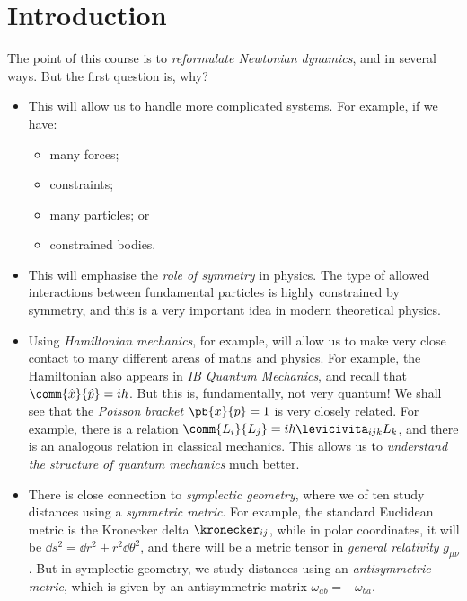 \section*{Introduction}

The point of this course is to \emph{reformulate Newtonian dynamics}, and in several ways. But the first question is, why?

\begin{itemize}
    \item This will allow us to handle more complicated systems. For example, if we have:
    \begin{itemize}
        \item many forces;
        \item constraints;
        \item many particles; or
        \item constrained bodies.
    \end{itemize}
    \item This will emphasise the \emph{role of symmetry} in physics. The type of allowed interactions between fundamental particles is highly constrained by symmetry, and this is a very important idea in modern theoretical physics.
    \item Using \emph{Hamiltonian mechanics}, for example, will allow us to make very close contact to many different areas of maths and physics. For example, the Hamiltonian also appears in \textit{IB Quantum Mechanics}, and recall that \(\comm{\hat{x}}{\hat{p}} = i \hbar\). But this is, fundamentally, not very quantum! We shall see that the \emph{Poisson bracket} \(\pb{x}{p} = 1\) is very closely related. For example, there is a relation \(\comm{L_i}{L_j} = i \hbar \levicivita_{ijk} L_k\), and there is an analogous relation in classical mechanics. This allows us to \emph{understand the structure of quantum mechanics} much better.
    \item There is close connection to \emph{symplectic geometry}, where we of ten study distances using a \emph{symmetric metric}. For example, the standard Euclidean metric is the Kronecker delta \(\kronecker_{ij}\), while in polar coordinates, it will be \(\dd{s}^2 = \dd{r}^2 + r^2 \dd{\theta}^2\), and there will be a metric tensor in \emph{general relativity} \(g_{\mu\nu}\). But in symplectic geometry, we study distances using an \emph{antisymmetric metric}, which is given by an antisymmetric matrix \(\omega_{ab} = - \omega_{ba}\).
\end{itemize}